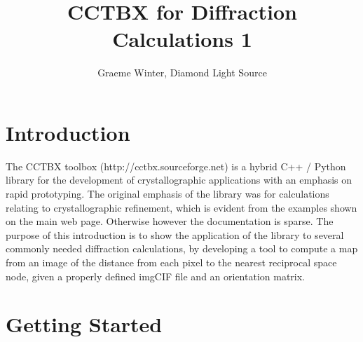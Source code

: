 \documentclass[a4paper, 11pt]{article}
\title{CCTBX for Diffraction Calculations 1}
\author{Graeme Winter, Diamond Light Source}
\begin{document}
\maketitle

\section{Introduction}

The CCTBX toolbox (http://cctbx.sourceforge.net) is a hybrid C++ / Python library for the development of crystallographic applications with an emphasis on rapid prototyping. The original emphasis of the library was for calculations relating to crystallographic refinement, which is evident from the examples shown on the main web page. Otherwise however the documentation is sparse. The purpose of this introduction is to show the application of the library to several commonly needed diffraction calculations, by developing a tool to compute a map from an image of the distance from each pixel to the nearest reciprocal space node, given a properly defined imgCIF file and an orientation matrix.

\section{Getting Started}
\end{document}
